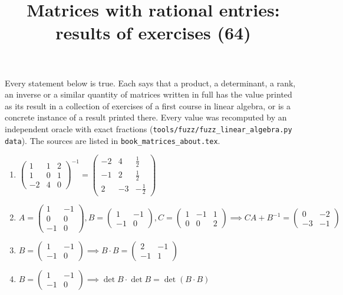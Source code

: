 \documentclass[11pt,a4paper]{article}
\title{Matrices with rational entries: results of exercises (64)}
\author{}
\date{}
\begin{document}
\maketitle
Every statement below is true. Each says that a product, a determinant, a rank, an inverse or a similar quantity of matrices written in full has the value printed as its result in a collection of exercises of a first course in linear algebra, or is a concrete instance of a result printed there. Every value was recomputed by an independent oracle with exact fractions (\texttt{tools/fuzz/fuzz\_linear\_algebra.py data}). The sources are listed in \texttt{book\_matrices\_about.tex}.

\begin{enumerate}
\item $\displaystyle \begin{pmatrix} 1 & 1 & 2 \\ 1 & 0 & 1 \\ -2 & 4 & 0 \end{pmatrix}^{-1} = \begin{pmatrix} -2 & 4 & \frac{1}{2} \\ -1 & 2 & \frac{1}{2} \\ 2 & -3 & -\frac{1}{2} \end{pmatrix}$
\item $\displaystyle A = \begin{pmatrix} 1 & -1 \\ 0 & 0 \\ -1 & 0 \end{pmatrix}, B = \begin{pmatrix} 1 & -1 \\ -1 & 0 \end{pmatrix}, C = \begin{pmatrix} 1 & -1 & 1 \\ 0 & 0 & 2 \end{pmatrix} \implies C A + B^{-1} = \begin{pmatrix} 0 & -2 \\ -3 & -1 \end{pmatrix}$
\item $\displaystyle B = \begin{pmatrix} 1 & -1 \\ -1 & 0 \end{pmatrix} \implies B \cdot B = \begin{pmatrix} 2 & -1 \\ -1 & 1 \end{pmatrix}$
\item $\displaystyle B = \begin{pmatrix} 1 & -1 \\ -1 & 0 \end{pmatrix} \implies \det B \cdot \det B = \det\left( B \cdot B \right)$

\end{enumerate}
\end{document}
